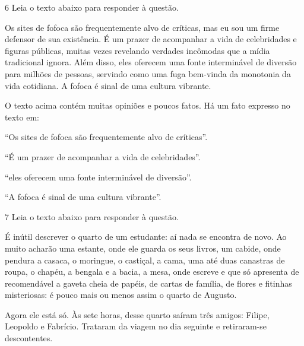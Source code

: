 \num{6} Leia o texto abaixo para responder à questão. 

\begin{myquote}

Os sites de fofoca são frequentemente alvo de críticas, mas eu sou
um firme defensor de sua existência. É um prazer de acompanhar a vida de celebridades
e figuras públicas, muitas vezes revelando verdades incômodas que a mídia tradicional 
ignora. Além disso, eles oferecem uma fonte interminável de diversão para milhões de
pessoas, servindo como uma fuga bem-vinda da monotonia da vida cotidiana. A
fofoca é sinal de uma cultura vibrante.


\end{myquote}

O texto acima contém muitas opiniões e poucos fatos. Há um fato
expresso no texto em:

\begin{escolha}

  \item ``Os sites de fofoca são frequentemente alvo de críticas''.
  
  \item ``É um prazer de acompanhar a vida de celebridades''.
  
  \item ``eles oferecem uma fonte interminável de diversão''.
  
  \item ``A fofoca é sinal de uma cultura vibrante''.

\end{escolha}

\num{7} Leia o texto abaixo para responder à questão.


\begin{myquote}

É inútil descrever o quarto de um estudante: aí nada se
encontra de novo. Ao muito acharão uma estante, onde ele guarda
os seus livros, um cabide, onde pendura a casaca, o moringue, o
castiçal, a cama, uma até duas canastras de roupa, o chapéu, a
bengala e a bacia, a mesa, onde escreve e que só apresenta de
recomendável a gaveta cheia de papéis, de cartas de família, de
flores e fitinhas misteriosas: é pouco mais ou menos assim o
quarto de Augusto.

Agora ele está só. Às sete horas, desse quarto saíram três
amigos: Filipe, Leopoldo e Fabrício. Trataram da viagem no dia 
seguinte e retiraram-se descontentes.


\end{myquote}

